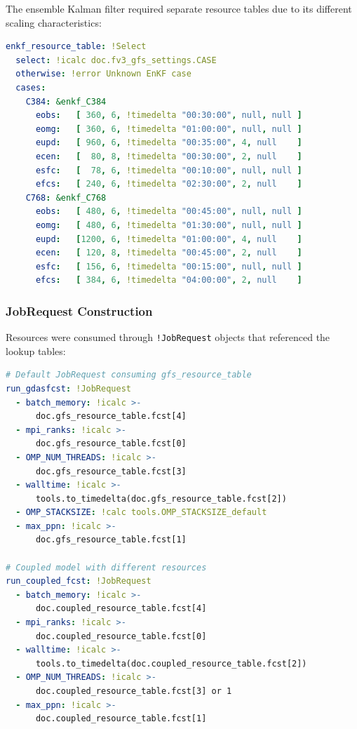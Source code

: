 \documentclass[11pt,twoside]{article}
\newcommand{\crow}{\textsc{CROW}}
\begin{document}
The ensemble Kalman filter required separate resource tables due to its different scaling characteristics:

\begin{lstlisting}[language=YAML, caption={\crow{} EnKF Resource Table}]
enkf_resource_table: !Select
  select: !icalc doc.fv3_gfs_settings.CASE
  otherwise: !error Unknown EnKF case
  cases:
    C384: &enkf_C384
      eobs:   [ 360, 6, !timedelta "00:30:00", null, null ]
      eomg:   [ 360, 6, !timedelta "01:00:00", null, null ]
      eupd:   [ 960, 6, !timedelta "00:35:00", 4, null    ]
      ecen:   [  80, 8, !timedelta "00:30:00", 2, null    ]
      esfc:   [  78, 6, !timedelta "00:10:00", null, null ]
      efcs:   [ 240, 6, !timedelta "02:30:00", 2, null    ]
    C768: &enkf_C768
      eobs:   [ 480, 6, !timedelta "00:45:00", null, null ]
      eomg:   [ 480, 6, !timedelta "01:30:00", null, null ]
      eupd:   [1200, 6, !timedelta "01:00:00", 4, null    ]
      ecen:   [ 120, 8, !timedelta "00:45:00", 2, null    ]
      esfc:   [ 156, 6, !timedelta "00:15:00", null, null ]
      efcs:   [ 384, 6, !timedelta "04:00:00", 2, null    ]
\end{lstlisting}

\subsubsection{JobRequest Construction}

Resources were consumed through \texttt{!JobRequest} objects that referenced the lookup tables:

\begin{lstlisting}[language=YAML, caption={\crow{} JobRequest Pattern}]
# Default JobRequest consuming gfs_resource_table
run_gdasfcst: !JobRequest
  - batch_memory: !icalc >-
      doc.gfs_resource_table.fcst[4]
  - mpi_ranks: !icalc >-
      doc.gfs_resource_table.fcst[0]
  - OMP_NUM_THREADS: !icalc >-
      doc.gfs_resource_table.fcst[3]
  - walltime: !icalc >-
      tools.to_timedelta(doc.gfs_resource_table.fcst[2])
  - OMP_STACKSIZE: !calc tools.OMP_STACKSIZE_default
  - max_ppn: !icalc >-
      doc.gfs_resource_table.fcst[1]

# Coupled model with different resources
run_coupled_fcst: !JobRequest
  - batch_memory: !icalc >-
      doc.coupled_resource_table.fcst[4]
  - mpi_ranks: !icalc >-
      doc.coupled_resource_table.fcst[0]
  - walltime: !icalc >-
      tools.to_timedelta(doc.coupled_resource_table.fcst[2])
  - OMP_NUM_THREADS: !icalc >-
      doc.coupled_resource_table.fcst[3] or 1
  - max_ppn: !icalc >-
      doc.coupled_resource_table.fcst[1]
\end{lstlisting}
\end{document}
